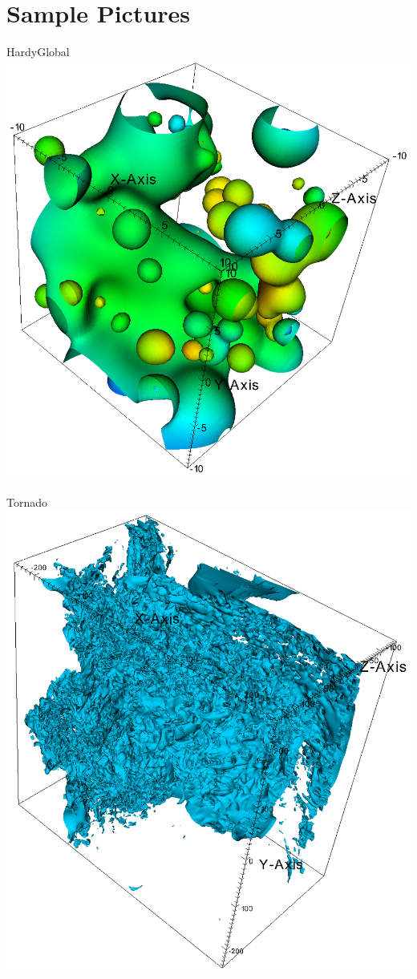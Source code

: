\chapter*{Sample Pictures}

HardyGlobal\\
\includegraphics[width=1\textwidth]{./pictures/hardyglobal.png}~\\

Tornado\\
\includegraphics[width=1\textwidth]{./pictures/tornado.png}~\\
